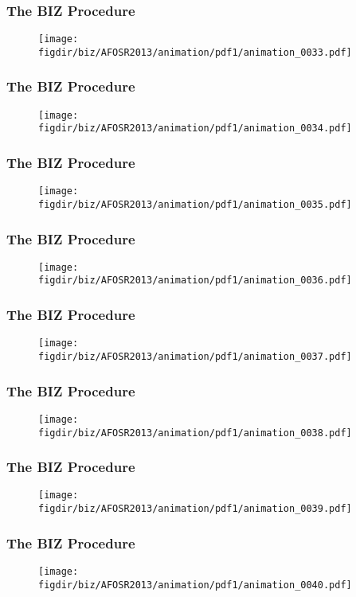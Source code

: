 \documentclass[13pt]{beamer}
\newcommand{\figdir}{../../fig}
\begin{document}
{\begin{frame}\frametitle{The BIZ Procedure}\begin{figure}\texttt{[image: \\figdir/biz/AFOSR2013/animation/pdf1/animation\_0033.pdf]}\end{figure}\end{frame}
\begin{frame}\frametitle{The BIZ Procedure}\begin{figure}\texttt{[image: \\figdir/biz/AFOSR2013/animation/pdf1/animation\_0034.pdf]}\end{figure}\end{frame}
\begin{frame}\frametitle{The BIZ Procedure}\begin{figure}\texttt{[image: \\figdir/biz/AFOSR2013/animation/pdf1/animation\_0035.pdf]}\end{figure}\end{frame}
\begin{frame}\frametitle{The BIZ Procedure}\begin{figure}\texttt{[image: \\figdir/biz/AFOSR2013/animation/pdf1/animation\_0036.pdf]}\end{figure}\end{frame}
\begin{frame}\frametitle{The BIZ Procedure}\begin{figure}\texttt{[image: \\figdir/biz/AFOSR2013/animation/pdf1/animation\_0037.pdf]}\end{figure}\end{frame}
\begin{frame}\frametitle{The BIZ Procedure}\begin{figure}\texttt{[image: \\figdir/biz/AFOSR2013/animation/pdf1/animation\_0038.pdf]}\end{figure}\end{frame}
\begin{frame}\frametitle{The BIZ Procedure}\begin{figure}\texttt{[image: \\figdir/biz/AFOSR2013/animation/pdf1/animation\_0039.pdf]}\end{figure}\end{frame}
\begin{frame}\frametitle{The BIZ Procedure}\begin{figure}\texttt{[image: \\figdir/biz/AFOSR2013/animation/pdf1/animation\_0040.pdf]}\end{figure}\end{frame}
}
\end{document}
